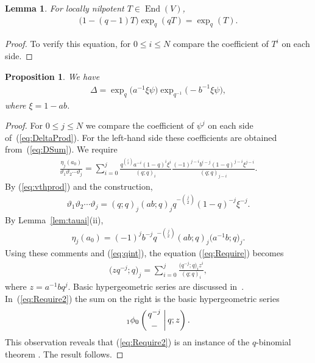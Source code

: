 \documentclass[pdftex]{sigma}
\numberwithin{equation}{section}
\newtheorem{Lemma}[Theorem]{Lemma}
\newtheorem{Proposition}[Theorem]{Proposition}
\begin{document}
\begin{Lemma}\label{lem:qexp}
For locally nilpotent $T \in \operatorname{End}(V)$,
\begin{gather*}
\bigl(1-(q-1)T\bigr) \exp_q(qT) = \exp_q (T).
\end{gather*}
\end{Lemma}
\begin{proof} To verify this equation, for $0 \leq i \leq N$ compare the
coefficient of $T^i$ on each side.
\end{proof}

\begin{Proposition}\label{prop:DeltaExp}
We have
\begin{gather}
\Delta = \exp_q \big( a^{-1} \xi \psi \big)
 \exp_{q^{-1}} \big({-}b^{-1} \xi \psi \big),\label{eq:DeltaProd}
\end{gather}
where $\xi = 1-ab$.
\end{Proposition}
\begin{proof}For $0 \leq j \leq N$
we compare the coefficient of $\psi^j$ on each side of~(\ref{eq:DeltaProd}). For the left-hand side
these coefficients are obtained from~(\ref{eq:DSum}).
We require
\begin{gather}\label{eq:Require}
\frac{\eta_j(a_0)}{\vartheta_1 \vartheta_2 \cdots \vartheta_j}
=
\sum_{i=0}^j \frac{q^{\binom{i}{2}}a^{-i}(1-q)^i \xi^i }{(q;q)_i}
\frac{(-1)^{j-i} b^{i-j}(1-q)^{j-i} \xi^{j-i} }{(q;q)_{j-i}}.
\end{gather}
By (\ref{eq:vthprod}) and the construction,
\begin{gather*}
\vartheta_1 \vartheta_2 \cdots \vartheta_j = (q;q)_j (ab;q)_j
q^{-\binom{j}{2}} (1-q)^{-j} \xi^{-j}.
\end{gather*}
By Lemma~\ref{lem:tauai}(ii),
\begin{gather*}
\eta_j(a_0)= (-1)^j b^{-j} q^{-\binom{j}{2}}(ab;q)_j \big(a^{-1}b;q\big)_j.
\end{gather*}
Using these comments and (\ref{eq:qint}),
the equation (\ref{eq:Require}) becomes
\begin{gather}
\big(zq^{-j};q\big)_j = \sum_{i=0}^j \frac{\big(q^{-j};q\big)_i z^i}{(q;q)_i},
\label{eq:Require2}
\end{gather}
where $z= a^{-1}bq^j$.
Basic hypergeometric series are discussed in~\cite{gr,koekoek}. In~(\ref{eq:Require2}) the sum on the right is the basic hypergeometric series
\begin{gather*}
 {}_1\phi_0 \left(
 \genfrac{}{}{0pt}{}
 {q^{-j} }
 {- }
 \,\bigg\vert \, q; z \right).
\end{gather*}
This observation reveals
that (\ref{eq:Require2}) is an instance of the $q$-binomial theorem
\cite[Section~1.3]{gr}.
The result follows.
\end{proof}
\end{document}
